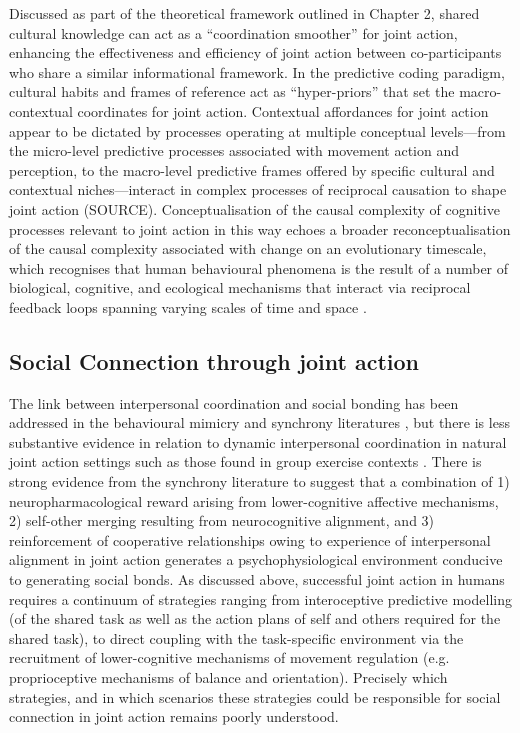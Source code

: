 \begin{CJK}{UTF8}{gbsn}
Discussed as part of the theoretical framework outlined in Chapter 2, shared cultural knowledge can act as a ``coordination smoother'' \citep{Vesper2017} for joint action, enhancing the effectiveness and efficiency of joint action between co-participants who share a similar informational framework.  In the predictive coding paradigm, cultural habits and frames of reference act as ``hyper-priors'' that set the macro-contextual coordinates for joint action\citep{Clark2013}.  Contextual affordances for joint action appear to be dictated by processes operating at multiple conceptual levels---from the micro-level predictive processes associated with movement action and perception, to the macro-level predictive frames offered by specific cultural and contextual niches---interact in complex processes of reciprocal causation to shape joint action (SOURCE).  Conceptualisation of the causal complexity of cognitive processes relevant to joint action in this way echoes a broader reconceptualisation of the causal complexity associated with change on an evolutionary timescale, which recognises that human behavioural phenomena is the result of a number of biological, cognitive, and ecological mechanisms that interact via reciprocal feedback loops spanning varying scales of time and space \citep{Fuentes2015}.


\subsection{Social Connection through joint action}
The link between interpersonal coordination and social bonding has been addressed in the behavioural mimicry and synchrony literatures \citep[e.g.,][]{Wheatley2012,Launay2016,Mogan2017}, but there is less substantive evidence in relation to dynamic interpersonal coordination in natural joint action settings such as those found in group exercise contexts \citep{Marsh2009,Miles2009,Lumsden2012}.  There is strong evidence from the synchrony literature to suggest that a combination of 1) neuropharmacological reward arising from lower-cognitive affective mechanisms, 2) self-other merging resulting from neurocognitive alignment, and 3) reinforcement of cooperative relationships owing to experience of interpersonal alignment in joint action generates a psychophysiological environment conducive to generating social bonds.  As discussed above, successful joint action in humans requires a continuum of strategies ranging from interoceptive predictive modelling (of the shared task as well as the action plans of self and others required for the shared task), to direct coupling with the task-specific environment via the recruitment of lower-cognitive mechanisms of movement regulation (e.g. proprioceptive mechanisms of balance and orientation).  Precisely which strategies, and in which scenarios these strategies could be responsible for social connection in joint action remains poorly understood.


\end{CJK}
